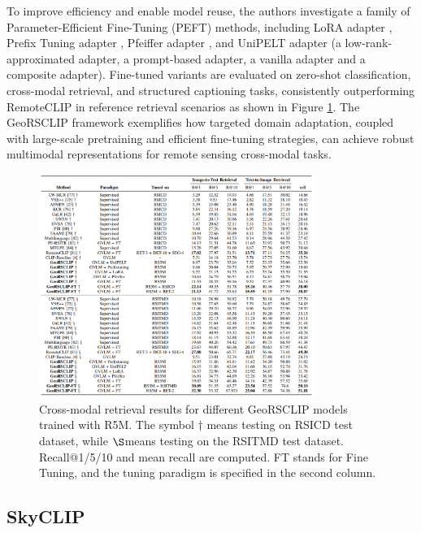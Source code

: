 \documentclass[a4paper, oneside, english]{sapthesis} %
\begin{document}
To improve efficiency and enable model reuse, the authors investigate a family of Parameter-Efficient Fine-Tuning (PEFT) methods, including LoRA adapter \cite{hu2021loralowrankadaptationlarge}, Prefix Tuning adapter \cite{li2021prefix}, Pfeiffer adapter \cite{pfeiffer2020adapterfusion}, and UniPELT adapter \cite{mao2021unipelt} (a low-rank-approximated adapter, a prompt-based adapter, a vanilla adapter and a composite adapter). Fine-tuned variants are evaluated on zero-shot classification, cross-modal retrieval, and structured captioning tasks, consistently outperforming RemoteCLIP in reference retrieval scenarios as shown in Figure \ref{fig:georsclip-performance}. The GeoRSCLIP framework exemplifies how targeted domain adaptation, coupled with large-scale pretraining and efficient fine-tuning strategies, can achieve robust multimodal representations for remote sensing cross-modal tasks.

\begin{figure}[h]
    \centering
    \includegraphics[width=0.8\textwidth]{img/georsclip-retrieval-performance.png}
    \caption{Cross-modal retrieval results for different GeoRSCLIP models trained with R5M. The symbol $\dagger$ means testing on RSICD test dataset, while $\S$means testing on the RSITMD test dataset. Recall@1/5/10 and mean recall are computed. FT stands for Fine Tuning, and the tuning paradigm is specified in the second column.}
    \label{fig:georsclip-performance}
\end{figure}


\subsection{SkyCLIP}
\end{document}
